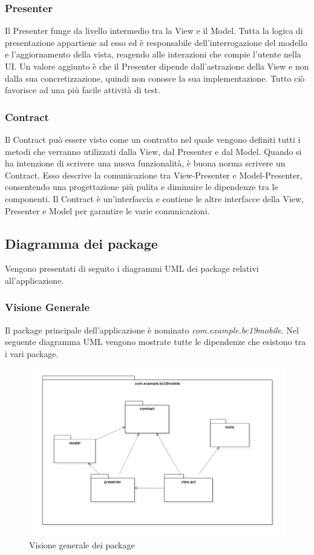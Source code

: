 \subsubsection{Presenter}
Il Presenter funge da livello intermedio tra la View e il Model. Tutta la logica di presentazione appartiene ad esso ed è responsabile dell'interrogazione del modello e l'aggiornamento della vista, reagendo alle interazioni che compie l'utente nella UI. Un valore aggiunto è che il Presenter dipende dall'astrazione della View e non dalla sua concretizzazione, quindi non conosce la sua implementazione. Tutto ciò favorisce ad una più facile attività di test.

\subsubsection{Contract}
Il Contract può essere visto come un contratto nel quale vengono definiti tutti i metodi che verranno utilizzati dalla View, dal Presenter e dal Model. Quando si ha intenzione di scrivere una nuova funzionalità, è buona norma scrivere un Contract. Esso descrive la comunicazione tra View-Presenter e Model-Presenter, consentendo una progettazione più pulita e diminuire le dipendenze tra le componenti.
Il Contract è un'interfaccia e contiene le altre interfacce della View, Presenter e Model per garantire le varie comunicazioni.


\subsection{Diagramma dei package}
Vengono presentati di seguito i diagrammi UML dei package relativi all'applicazione.

\subsubsection{Visione Generale}
Il package principale dell'applicazione è nominato \textit{com.example.bc19mobile}.
Nel seguente diagramma UML vengono mostrate tutte le dipendenze che esistono tra i vari package.
\begin{figure}[H]
	\centering
	\includegraphics[width=16cm]{res/images/apputenti-packageGenerale.png}
	\caption{Visione generale dei package}
	\label{fig:Visione generale dei package}
\end{figure}

